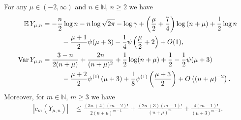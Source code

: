 \documentclass[10pt]{amsart}
\theoremstyle{definition}\newtheorem{defi}[theo]{Definition}\newtheorem{rema}[theo]{Remark}\newtheorem{exam}[theo]{Example}\newtheorem{exem}[theo]{Example}\newtheorem{nota}[theo]{Notation}
\newcommand{\N}{\mathbb{N}}
\newcommand{\EE}{\mathbb{E}\,}
\newcommand{\Var}{\mathop{\mathrm{Var}}\nolimits}
\begin{document}
\begin{prop}\label{lem:CumulantBounds}
For any $\mu\in(-2,\infty)$ and $n\in\N$, $n\ge 2$ we have
\begin{align*}
\EE Y_{\mu,n}&=-\frac{n}{2}\log n-n\log\sqrt{2\pi}-\log\gamma +\left(\frac{\mu}{2}+\frac{7}{4}\right)\log\left(n+\mu\right)+\frac{1}{2}\log n\\
&\mkern50mu -\frac{\mu+1}{2}\psi(\mu+3)-\frac{1}{4}\psi\left(\frac{\mu}{2}+2\right)+O(1),\\[0.20em]
\Var Y_{\mu,n}&=\frac{3-n}{2(n+\mu)}+\frac{2n}{(n+\mu)^2}+\frac12\log(n+\mu)+\frac{1}{2}-\frac12\psi(\mu+3)\\
&\mkern50mu -\frac{\mu+2}{2}\psi^{(1)}\left(\mu+3\right)+\frac{1}{8}\psi^{(1)}\left(\frac{\mu+3}{2}\right)+O\left((n+\mu)^{-2}\right).
\end{align*}
Moreover, for $m\in\N$, $m\geq 3$ we have
\begin{align*}
\left|c_m(Y_{\mu,n})\right|&\leq\frac{(3n+4)(m-2)!}{2(n+\mu)^{m-1}}+\frac{(2n+3)(m-1)!}{(n+\mu)^{m}}+\frac{4(m-1)!}{(\mu+3)^{m-2}}.
\end{align*}
\end{prop}
\end{document}
